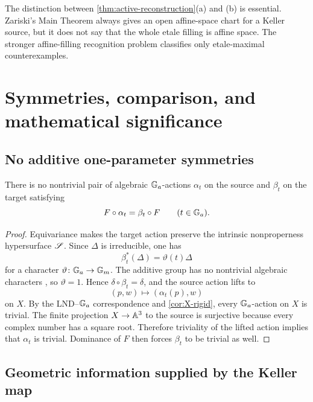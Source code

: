 \begin{remark}\label{rem:reconstruction-correction}
The distinction between \cref{thm:active-reconstruction}(a) and (b) is essential.  Zariski's Main Theorem always gives an open affine-space chart for a Keller source, but it does not say that the whole etale filling is affine space.  The stronger affine-filling recognition problem classifies only etale-maximal counterexamples.
\end{remark}

\section{Symmetries, comparison, and mathematical significance}\label{sec:significance}

\subsection{No additive one-parameter symmetries}

\begin{proposition}\label{prop:no-additive-symmetries}
There is no nontrivial pair of algebraic $\mathbb G_a$-actions $\alpha_t$ on the source and $\beta_t$ on the target satisfying
\[
  F\circ\alpha_t=\beta_t\circ F
  \qquad(t\in\mathbb G_a).
\]
\end{proposition}

\begin{proof}
Equivariance makes the target action preserve the intrinsic nonproperness hypersurface $\mathscr S$.  Since $\Delta$ is irreducible, one has
\[
  \beta_t^*(\Delta)=\vartheta(t)\Delta
\]
for a character $\vartheta\colon\mathbb G_a\to\mathbb G_m$.  The additive group has no nontrivial algebraic characters \cite[Chapter 12]{Milne2017}, so $\vartheta=1$.  Hence $\delta\circ\beta_t=\delta$, and the source action lifts to
\[
  (p,w)\longmapsto(\alpha_t(p),w)
\]
on $X$.  By the LND--$\mathbb G_a$ correspondence \cite[Chapter 1]{Freudenburg2017} and \cref{cor:X-rigid}, every $\mathbb G_a$-action on $X$ is trivial.  The finite projection $X\to\mathbb A^3$ to the source is surjective because every complex number has a square root.  Therefore triviality of the lifted action implies that $\alpha_t$ is trivial.  Dominance of $F$ then forces $\beta_t$ to be trivial as well.
\end{proof}

\subsection{Geometric information supplied by the Keller map}

